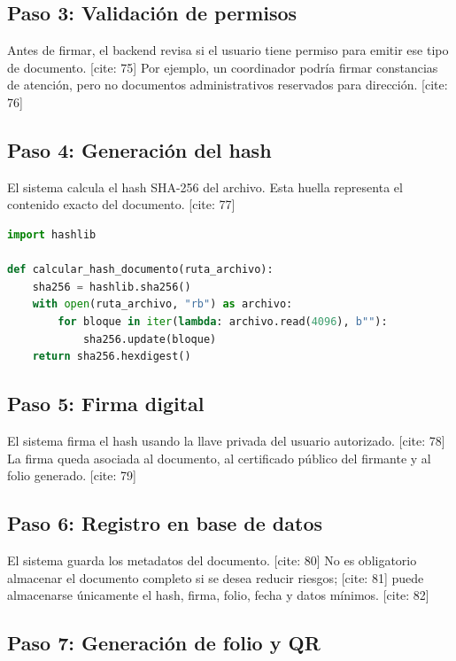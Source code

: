 \documentclass[10pt]{article} [cite: 1]
\begin{document}
\subsection{Paso 3: Validación de permisos}

Antes de firmar, el backend revisa si el usuario tiene permiso para emitir ese tipo de documento. [cite: 75] Por ejemplo, un coordinador podría firmar constancias de atención, pero no documentos administrativos reservados para dirección. [cite: 76]

\subsection{Paso 4: Generación del hash}

El sistema calcula el hash SHA-256 del archivo. Esta huella representa el contenido exacto del documento. [cite: 77]

\begin{lstlisting}[language=Python, caption={Ejemplo conceptual de generación de hash}]
import hashlib

def calcular_hash_documento(ruta_archivo):
    sha256 = hashlib.sha256()
    with open(ruta_archivo, "rb") as archivo:
        for bloque in iter(lambda: archivo.read(4096), b""):
            sha256.update(bloque)
    return sha256.hexdigest()
\end{lstlisting}

\subsection{Paso 5: Firma digital}

El sistema firma el hash usando la llave privada del usuario autorizado. [cite: 78] La firma queda asociada al documento, al certificado público del firmante y al folio generado. [cite: 79]

\subsection{Paso 6: Registro en base de datos}

El sistema guarda los metadatos del documento. [cite: 80] No es obligatorio almacenar el documento completo si se desea reducir riesgos; [cite: 81] puede almacenarse únicamente el hash, firma, folio, fecha y datos mínimos. [cite: 82]

\subsection{Paso 7: Generación de folio y QR}
\end{document}
